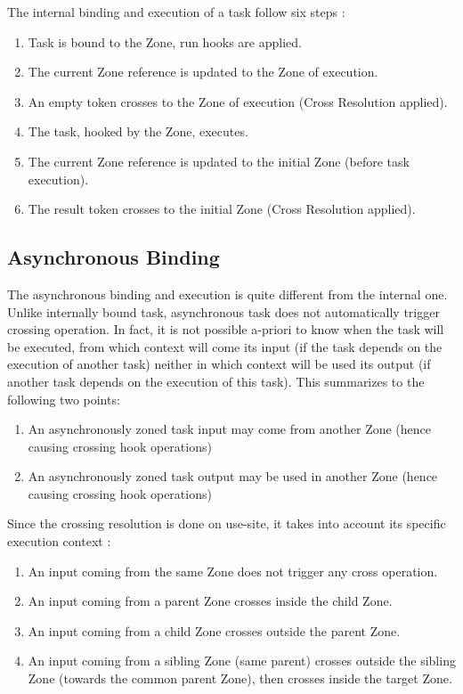 The internal binding and execution of a task follow six steps :
\begin{enumerate}
\item Task is bound to the Zone, run hooks are applied.
\item The current Zone reference is updated to the Zone of execution.
\item An empty token crosses to the Zone of execution (Cross Resolution applied).
\item The task, hooked by the Zone, executes.
\item The current Zone reference is updated to the initial Zone (before task execution).
\item The result token crosses to the initial Zone (Cross Resolution applied).
\end{enumerate}

\subsection*{Asynchronous Binding}

The asynchronous binding and execution is quite different from the internal one. Unlike internally bound task, asynchronous task does not automatically trigger crossing operation. In fact, it is not possible a-priori to know when the task will be executed, from which context will come its input (if the task depends on the execution of another task) neither in which context will be used its output (if another task depends on the execution of this task). This summarizes to the following two points:
\begin{enumerate}
\item An asynchronously zoned task input may come from another Zone (hence causing crossing hook operations)
\item An asynchronously zoned task output may be used in another Zone (hence causing crossing hook operations)
\end{enumerate}

Since the crossing resolution is done on use-site, it takes into account its specific execution context :
\begin{enumerate}
\item An input coming from the same Zone does not trigger any cross operation.
\item An input coming from a parent Zone crosses inside the child Zone.
\item An input coming from a child Zone crosses outside the parent Zone.
\item An input coming from a sibling Zone (same parent) crosses outside the sibling Zone (towards the common parent Zone), then crosses inside the target Zone.
\end{enumerate}


